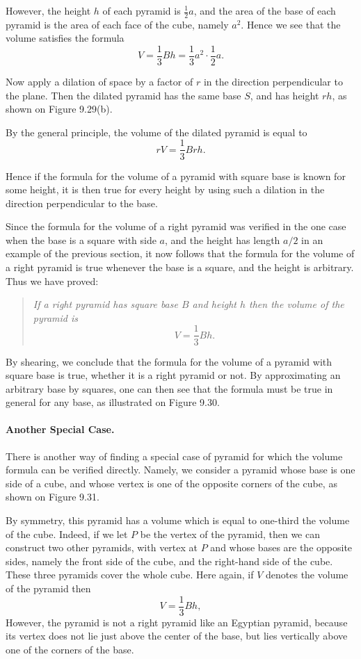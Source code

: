 \documentclass[12pt]{book} %
\begin{document}
However, the height $h$ of each pyramid is $\frac12 a$, and the area of the base of each pyramid is the area of each face of the cube, namely $a^2$. Hence we see that the volume satisfies the formula
\[
V=\frac13 Bh=\frac13 a^2\cdot \frac12 a.
\]

Now apply a dilation of space by a factor of $r$ in the direction perpendicular to the plane. Then the dilated pyramid has the same base $S$, and has height $rh$, as shown on Figure 9.29(b).


By the general principle, the volume of the dilated pyramid is equal to
\[
rV=\frac13 Brh.
\]

Hence if the formula for the volume of a pyramid with square base is known for some height, it is then true for every height by using such a dilation in the direction perpendicular to the base.

Since the formula for the volume of a right pyramid was verified in the one case when the base is a square with side $a$, and the height has length $a/2$ in an example of the previous section, it now follows that the formula for the volume of a right pyramid is true whenever the base is a square, and the height is arbitrary. Thus we have proved:

\begin{quote}
\textit{If a right pyramid has square base $B$ and height $h$ then the volume of the pyramid is}
\[
V=\frac13 Bh.
\]
\end{quote}

By shearing, we conclude that the formula for the volume of a pyramid with square base is true, whether it is a right pyramid or not. By approximating an arbitrary base by squares, one can then see that the formula must be true in general for any base, as illustrated on Figure 9.30.


\paragraph{Another Special Case.}
There is another way of finding a special case of pyramid for which the volume formula can be verified directly. Namely, we consider a pyramid whose base is one side of a cube, and whose vertex is one of the opposite corners of the cube, as shown on Figure 9.31.


By symmetry, this pyramid has a volume which is equal to one-third the volume of the cube. Indeed, if we let $P$ be the vertex of the pyramid, then we can construct two other pyramids, with vertex at $P$ and whose bases are the opposite sides, namely the front side of the cube, and the right-hand side of the cube. These three pyramids cover the whole cube. Here again, if $V$ denotes the volume of the pyramid then
\[
V=\frac13 Bh,
\]
However, the pyramid is not a right pyramid like an Egyptian pyramid, because its vertex does not lie just above the center of the base, but lies vertically above one of the corners of the base.
\end{document}
